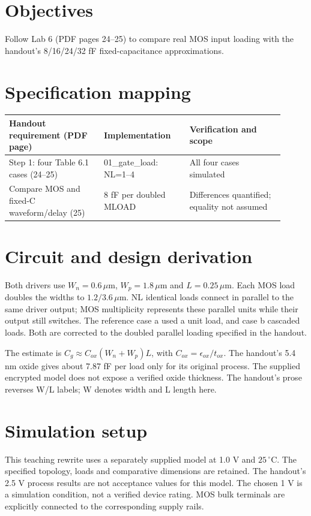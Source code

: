 \section{Objectives}
Follow Lab 6 (PDF pages 24--25) to compare real MOS input loading with the handout's 8/16/24/32 fF fixed-capacitance approximations.

\section{Specification mapping}
\begin{longtable}{p{0.31\linewidth}p{0.29\linewidth}p{0.31\linewidth}}
\toprule
Handout requirement (PDF page) & Implementation & Verification and scope \\\midrule
Step 1: four Table 6.1 cases (24--25) & 01\_gate\_load: NL=1--4 & All four cases simulated \\
Compare MOS and fixed-C waveform/delay (25) & 8 fF per doubled MLOAD & Differences quantified; equality not assumed \\
\bottomrule
\end{longtable}


\section{Circuit and design derivation}
Both drivers use $W_n=0.6\,\mu$m, $W_p=1.8\,\mu$m and $L=0.25\,\mu$m. Each MOS load doubles the widths to $1.2/3.6\,\mu$m. NL identical loads connect in parallel to the same driver output; MOS multiplicity represents these parallel units while their output still switches. The reference case a used a unit load, and case b cascaded loads. Both are corrected to the doubled parallel loading specified in the handout.

The estimate is $C_g\approx C_{ox}(W_n+W_p)L$, with $C_{ox}=\epsilon_{ox}/t_{ox}$. The handout's 5.4 nm oxide gives about 7.87 fF per load only for its original process. The supplied encrypted model does not expose a verified oxide thickness. The handout's prose reverses W/L labels; W denotes width and L length here.

\section{Simulation setup}
This teaching rewrite uses a separately supplied model at 1.0 V and $25\,^{\circ}\mathrm C$. The specified topology, loads and comparative dimensions are retained. The handout's 2.5 V process results are not acceptance values for this model. The chosen 1 V is a simulation condition, not a verified device rating. MOS bulk terminals are explicitly connected to the corresponding supply rails.

